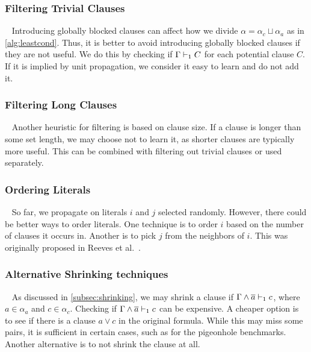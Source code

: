


\subsubsection{Filtering Trivial Clauses}~\label{subsubsec:filteringtriv}
Introducing globally blocked clauses can affect how we divide $\alpha = \alpha_c
\sqcup \alpha_a$ as in \autoref{alg:leastcond}. Thus, it is better to avoid
introducing globally blocked clauses if they are not useful. We do this by
checking if $\Gamma \vdash_1 C$ for each potential clause $C$. If it is implied by
unit propagation, we consider it easy to learn and do not add it.

\subsubsection{Filtering Long Clauses}~\label{subsubsec:filtering-length}
Another heuristic for filtering is based on clause size. If a clause is longer
than some set length, we may choose not to learn it, as shorter clauses are
typically more useful. This can be combined with filtering out trivial clauses
or used separately.

\subsubsection{Ordering Literals}~\label{subsubsec:ordering-literals}
So far, we propagate on literals $i$ and $j$ selected randomly.
However, there could be better ways to order literals. One technique is to order
$i$ based on the number of clauses it occurs in. Another is to pick $j$ from the neighbors of $i$. This was originally proposed in
Reeves et al.~\cite{prelearn}.

\subsubsection{Alternative Shrinking
techniques}~\label{subsubsec:shrink-techniques} As discussed in
\autoref{subsec:shrinking}, we may shrink a clause if
$\Gamma \land \overline{a} \vdash_1 c$, where $a \in \alpha_a$ and $c \in \alpha_c$.
Checking if $\Gamma \land \overline{a} \vdash_1 c$ can be expensive. A cheaper option is
to see if there is a clause $a \lor c$ in the original formula. While this may
miss some pairs, it is sufficient in certain cases, such as for the
pigeonhole benchmarks. Another alternative is to not shrink the clause
at all.

